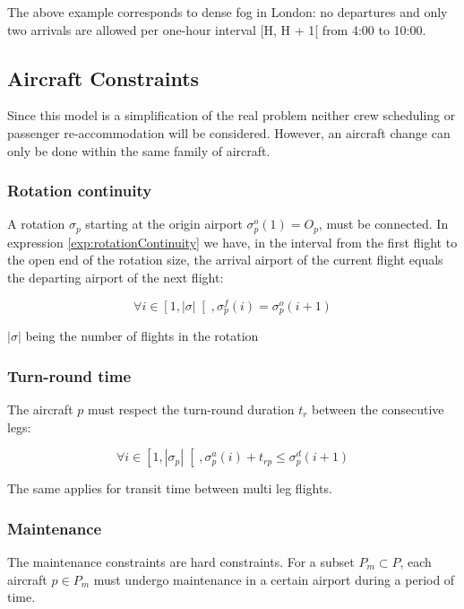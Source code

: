 \documentclass[ijoo,nonblindrev]{informs-ijoo}
\begin{document}
	The above example corresponds to dense fog in London: no departures and only two arrivals are allowed per one-hour interval [H, H + 1[ from 4:00 to 10:00.		

\subsection{Aircraft Constraints} \label{sec:aircConstraints}

Since this model is a simplification of the real problem neither crew scheduling or passenger re-accommodation will be considered. However, an aircraft change can only be done within the same family of aircraft.

\subsubsection{Rotation continuity}

A rotation $ \sigma_p$ starting  at the origin airport  $ \sigma^o_p(1) = O_p$, must be connected. In expression \ref{exp:rotationContinuity} we have, in the interval from the first flight to the open end of the rotation size, the arrival airport of the current flight equals the departing airport of the next flight:

\begin{equation}
	\label{exp:rotationContinuity}
	\forall i \in \left[1, |\sigma|\right[, \sigma^f_p(i) = \sigma^o_p(i+1)
\end{equation}

$ |\sigma| $ being the number of flights in the rotation

\subsubsection{Turn-round time}

The aircraft $p$ must respect the turn-round duration  $t_r$ between the consecutive legs:

\begin{equation}
	\label{exp:turnroundtime}
	\forall i \in \left[1, |\sigma_p|\right[, \sigma^a_p(i) + t_{rp} \leq \sigma^d_p(i+1)
\end{equation}


The same applies for transit time between multi leg flights.

\subsubsection{Maintenance}
The maintenance constraints are hard constraints. For a subset $P_m \subset P$, each aircraft $p \in P_m$ must undergo maintenance in a certain airport during a period of time.
\end{document}
